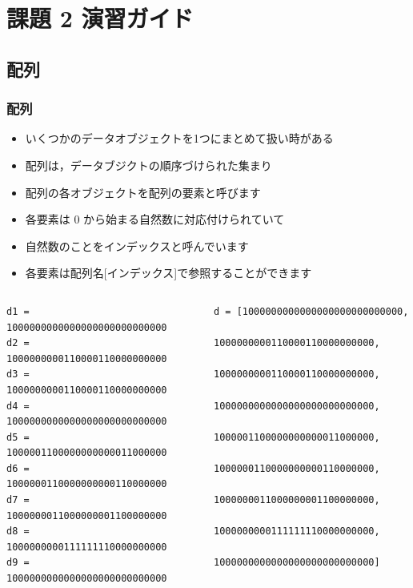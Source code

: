 \section{課題 2 演習ガイド}
%
%
\subsection{配列}
\begin{frame}[containsverbatim]
\frametitle{配列}
  \begin{itemize}
\item いくつかのデータオブジェクトを1つにまとめて扱い時がある
\item 配列は，データブジクトの順序づけられた集まり
\item 配列の各オブジェクトを配列の要素と呼びます
\item 各要素は 0 から始まる自然数に対応付けられていて
\item 自然数のことをインデックスと呼んでいます
\item 各要素は配列名[インデックス]で参照することができます
  \end{itemize}
\tiny
  \begin{columns}
    \begin{column}{0.45\textwidth}
      \begin{lstlisting}[caption={単純な変数},label=naive]
d1 =  1000000000000000000000000000
d2 =  1000000000110000110000000000
d3 =  1000000000110000110000000000
d4 =  1000000000000000000000000000
d5 =  1000001100000000000011000000
d6 =  1000000110000000000110000000
d7 =  1000000011000000001100000000
d8 =  1000000000111111110000000000
d9 =  1000000000000000000000000000
      \end{lstlisting}
    \end{column}
    \begin{column}{0.45\textwidth}
      \begin{lstlisting}[caption={配列},label=array]
 d = [1000000000000000000000000000,
      1000000000110000110000000000,
      1000000000110000110000000000,
      1000000000000000000000000000,
      1000001100000000000011000000,
      1000000110000000000110000000,
      1000000011000000001100000000,
      1000000000111111110000000000,
      1000000000000000000000000000]
      \end{lstlisting}
    \end{column}
  \end{columns}
\end{frame}

